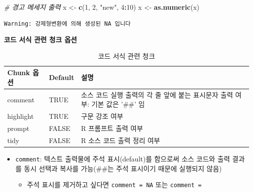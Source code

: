 \documentclass[
  11pt,
]{krantz}
\newenvironment{Shaded}{\begin{snugshade}}{\end{snugshade}}
\newcommand{\CommentTok}[1]{\textcolor[rgb]{0.37,0.37,0.37}{\textit{#1}}}
\newcommand{\DecValTok}[1]{\textcolor[rgb]{0.06,0.06,0.06}{#1}}
\newcommand{\KeywordTok}[1]{\textcolor[rgb]{0.27,0.27,0.27}{\textbf{#1}}}
\newcommand{\NormalTok}[1]{#1}
\newcommand{\OperatorTok}[1]{\textcolor[rgb]{0.43,0.43,0.43}{\textbf{#1}}}
\newcommand{\StringTok}[1]{\textcolor[rgb]{0.5,0.5,0.5}{#1}}
\providecommand{\tightlist}{%
  \setlength{\itemsep}{0pt}\setlength{\parskip}{0pt}}
\begin{document}
\normalsize

\footnotesize

\begin{Shaded}
\begin{Highlighting}[]
\CommentTok{# 경고 메세지 출력}
\NormalTok{x <-}\StringTok{ }\KeywordTok{c}\NormalTok{(}\DecValTok{1}\NormalTok{, }\DecValTok{2}\NormalTok{, }\StringTok{"new"}\NormalTok{, }\DecValTok{4}\OperatorTok{:}\DecValTok{10}\NormalTok{)}
\NormalTok{x <-}\StringTok{ }\KeywordTok{as.numeric}\NormalTok{(x)}
\end{Highlighting}
\end{Shaded}

\begin{verbatim}
Warning: 강제형변환에 의해 생성된 NA 입니다
\end{verbatim}

\normalsize

\textbf{코드 서식 관련 청크 옵션}

\footnotesize

\begin{table}[H]

\caption{\label{tab:chunk-tab-03}코드 서식 관련 청크}
\centering
\fontsize{11}{13}\selectfont
\begin{tabular}[t]{>{\raggedright\arraybackslash}p{3cm}>{\raggedright\arraybackslash}p{3cm}>{\raggedright\arraybackslash}p{8cm}}
\toprule
Chunk 옵션 & Default & 설명\\
\midrule
\rowcolor{gray!6}  comment & TRUE & 소스 코드 실행 출력의 각 줄 앞에 붙는 표시문자 출력 여부: 기본 값은 '\#\#' 임\\
highlight & TRUE & 구문 강조 여부\\
\rowcolor{gray!6}  prompt & FALSE & R 프롬프트 출력 여부\\
tidy & FALSE & R 소스 코드 출력 정리 여부\\
\bottomrule
\end{tabular}
\end{table}

\normalsize

\begin{itemize}
\tightlist
\item
  \texttt{comment}: 텍스트 출력물에 주석 표시(default)를 함으로써 소스 코드와 출력 결과를 동시 선택과 복사를 가능(\#\#는 주석 표시이기 때문에 실행되지 않음)

  \begin{itemize}
  \tightlist
  \item
    주석 표시를 제거하고 싶다면 \texttt{comment\ =\ NA} 또는 \texttt{comment\ =\ \textquotesingle{}\textquotesingle{}}
  \end{itemize}
\end{itemize}
\end{document}

